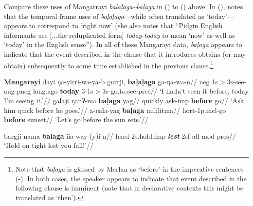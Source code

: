   
 Compare these uses of Mangarrayi \textit{baḷaḷaga\textasciitilde{baḷaga}} in () to () above. In (), \citet[138]{Merlan1989} notes that the temporal frame uses of \textit{baḷaḷaga}---while often translated as `today'---appears to correspond to `right now' (she also notes that ``Pidgin English informants use [...the reduplicated form] \textit{today-today} to mean `now' as well as `today' in the English sense''). In all of these Mangarayi data, \textit{baḷaga} appears to indicate that the event described in the clause that it introduces obtains (or may obtain) subsequently to some time established in the previous clause.\footnote{Note that \textit{baḷaga} is glossed by Merlan as `before' in the imperative sentences (-). In both cases, the speaker appears to indicate that event described in the following clause is imminent (note that in declarative contexts this might be translated as `then').} %
 
 
\pex\textbf{Mangarayi}
\a\begingl\gla ḏayi ŋa-yirri-wa-ya-b gurrji, \textbf{baḷaḷaga} ga-ŋa-wa-n//
\glb \gls{neg} 1s$\scriptscriptstyle>$3s-see-\gls{aug}-\gls{pneg} long.ago \textbf{today} 3-1s$\scriptscriptstyle>$3s-go.to.see-\gls{pres}//
\glft`I hadn't seen it before, today I'm seeing it.'//\endgl
\a\begingl\gla galaji ŋanʔ-ma \textbf{baḷaga} yag//
\glb quickly ask-\gls{imp} \textbf{before} go//
\glft`Ask him quick before he goes.'//\endgl
\a\begingl\gla a-ŋaḷa-yag \textbf{baḷaga} miḷiḷitma//
\glb \gls{hort}-1p.\gls{incl}-go \textbf{before} sunset//
\glft`Let's go before the sun sets.'//\endgl


\a\begingl\gla bargji nama \textbf{balaga} iia-way-(y)i-n//
\glb hard 2s.hold.\gls{imp} \textbf{\textsl{lest}} 2sf all-\gls{mod}-\gls{pres}//
\glft`Hold on tight lest you fall!'//\endgl


